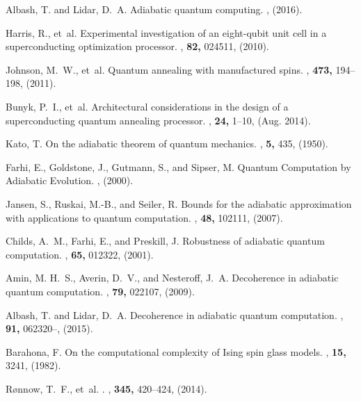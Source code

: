 \documentclass[aps,pra,groupedaddress,nofootinbib,notitlepage,showpacs,floatfix,superscriptaddress]{revtex4-1}
\begin{document}
\begin{thebibliography}{10}
Albash, T. and Lidar, D.~A.
\newblock Adiabatic quantum computing.
, (2016).

Harris, R., et~al.
\newblock Experimental investigation of an eight-qubit unit cell in a
  superconducting optimization processor.
, {\bf 82,} 024511, (2010).

Johnson, M.~W., et~al.
\newblock Quantum annealing with manufactured spins.
, {\bf 473,} 194--198, (2011).

Bunyk, P.~I., et~al.
\newblock Architectural considerations in the design of a superconducting
  quantum annealing processor.
, {\bf 24,}
  1--10, (Aug. 2014).

Kato, T.
\newblock On the adiabatic theorem of quantum mechanics.
, {\bf 5,} 435, (1950).

Farhi, E., Goldstone, J., Gutmann, S., and Sipser, M.
\newblock Quantum {Computation} by {Adiabatic} {Evolution}.
, (2000).

Jansen, S., Ruskai, M.-B., and Seiler, R.
\newblock Bounds for the adiabatic approximation with applications to quantum
  computation.
, {\bf 48,} 102111, (2007).

Childs, A.~M., Farhi, E., and Preskill, J.
\newblock Robustness of adiabatic quantum computation.
, {\bf 65,} 012322, (2001).

Amin, M. H.~S., Averin, D.~V., and Nesteroff, J.~A.
\newblock Decoherence in adiabatic quantum computation.
, {\bf 79,} 022107, (2009).

Albash, T. and Lidar, D.~A.
\newblock Decoherence in adiabatic quantum computation.
, {\bf 91,} 062320--, (2015).

Barahona, F.
\newblock On the computational complexity of {I}sing spin glass models.
, {\bf 15,} 3241, (1982).

R{\o}nnow, T.~F., et~al.
.
, {\bf 345,} 420--424, (2014).


\end{thebibliography}
\end{document}
